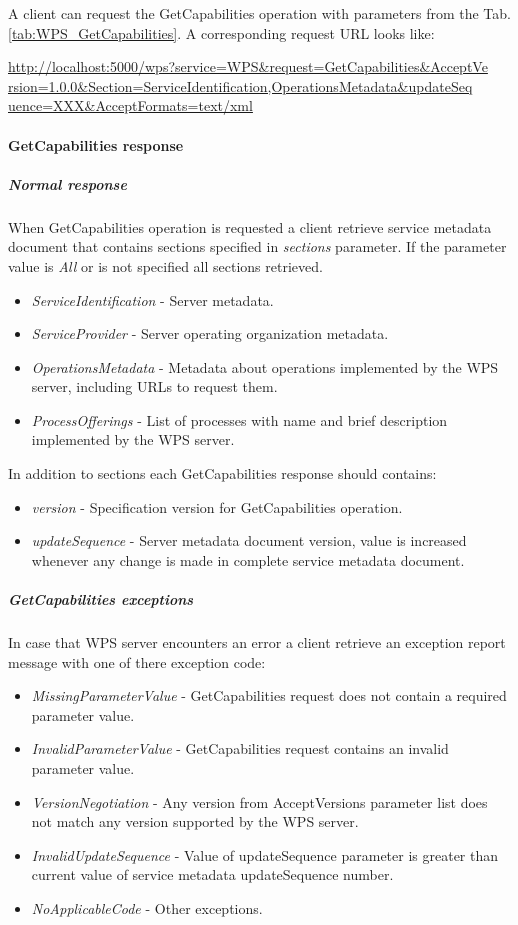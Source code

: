 \documentclass[12pt,a4paper]{article}
\begin{document}
A client can request the GetCapabilities operation with parameters from the Tab. \ref{tab:WPS_GetCapabilities}. A corresponding
request URL looks like:

\noindent
\url{http://localhost:5000/wps?service=WPS&request=GetCapabilities&AcceptVe}\\
\url{rsion=1.0.0&Section=ServiceIdentification,OperationsMetadata&updateSeq}\\
\url{uence=XXX&AcceptFormats=text/xml}

\paragraph{GetCapabilities response}
\label{para:GetCapa_response}
\subparagraph{Normal response}
When GetCapabilities operation is requested a client retrieve service metadata document that contains sections specified in
\textit{sections} parameter. If the parameter value is \textit{All} or is not specified all sections retrieved.

\begin{itemize}
\item\textit{ServiceIdentification} - Server metadata.
\item\textit{ServiceProvider} - Server operating organization metadata.
\item\textit{OperationsMetadata} - Metadata about operations implemented by the WPS server, including URLs to request them.
\item\textit{ProcessOfferings} - List of processes with name and brief description implemented by the WPS server.
\end{itemize}

\bigskip
In addition to sections each GetCapabilities response should contains:
\begin{itemize}
\item\textit{version} - Specification version for GetCapabilities operation.
\item\textit{updateSequence} - Server metadata document version, value is increased whenever any change is made in complete service metadata document.
\end{itemize}

\subparagraph{GetCapabilities exceptions}
In case that WPS server encounters an error a client retrieve an exception report message with one of there exception code:

\begin{itemize}
\item\textit{MissingParameterValue} - GetCapabilities request does not contain a required parameter value.
\item\textit{InvalidParameterValue} - GetCapabilities request contains an invalid parameter value.
\item\textit{VersionNegotiation} - Any version from AcceptVersions parameter list does not match any version supported by the WPS server.
\item\textit{InvalidUpdateSequence} - Value of updateSequence parameter is greater than current value of service metadata updateSequence number.
\item\textit{NoApplicableCode} - Other exceptions.
\end{itemize}
\end{document}
